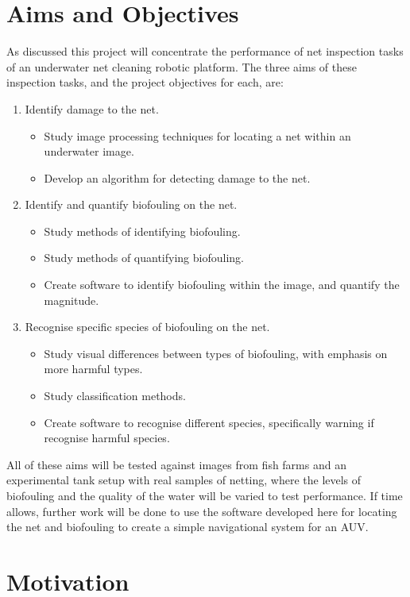 \documentclass[11.5pt, twoside, a4paper]{article}
\begin{document}
\section{Aims and Objectives}
As discussed this project will concentrate the performance of net inspection tasks of an underwater net cleaning robotic platform. The three aims of these inspection tasks, and the project objectives for each, are:
\begin{enumerate}
\item Identify damage to the net.
\begin{itemize}
\item Study image processing techniques for locating a net within an underwater image.
\item Develop an algorithm for detecting damage to the net.
\end{itemize}
\item Identify and quantify biofouling on the net.
\begin{itemize}
\item Study methods of identifying biofouling. %
\item Study methods of quantifying biofouling.
\item Create software to identify biofouling within the image, and quantify the magnitude.
\end{itemize}
\item Recognise specific species of biofouling on the net.
\begin{itemize}
\item Study visual differences between types of biofouling, with emphasis on more harmful types.
\item Study classification methods.
\item Create software to recognise different species, specifically warning if recognise harmful species.
\end{itemize}
\end{enumerate}
All of these aims will be tested against images from fish farms and an experimental tank setup with real samples of netting, where the levels of biofouling and the quality of the water will be varied to test performance. If time allows, further work will be done to use the software developed here for locating the net and biofouling to create a simple navigational system for an AUV.

\section{Motivation}
\end{document}
